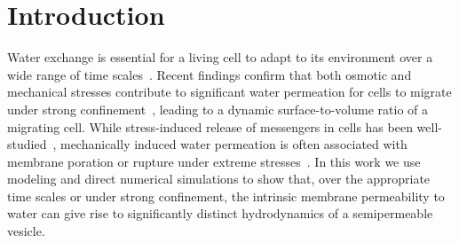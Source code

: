 \documentclass[prb,preprint,showpacs,preprintnumbers,amsmath,amssymb,longbibliography]{revtex4-1}
\begin{document}
\section{Introduction\label{s:introduction}}
Water exchange is essential for a living cell to adapt to its
environment over a wide range of time
scales~\cite{CadartVenkovaRechoEtAl2019_NaturePhys,
AlbertsMolecularBiology, YangMaVerkman2001_JBC,
SugieIntaglietta2018_AmJPhysiolHCP,
SaadounPapadopoulosWatanabeEtAl2005_JCS, Verkman2008_JMM,
BerthaudEtAl2016_SM, Keren2011_EurBJ, TaloniKardashSalmanEtAl2015_PRL}.  
%
Recent findings confirm that both osmotic and mechanical stresses
contribute to significant water permeation for cells to migrate under
strong confinement~\cite{JiangSun2013_BJ, StrokaJiangChenEtAl2014_Cell,
LiMoriSun2015_PRL, yao-mor2017}, leading to a dynamic surface-to-volume
ratio of a migrating cell. While stress-induced release of messengers in
cells has been well-studied~\cite{Wan2008_PNAS, ForsythWan2011_PNAS, 
Russell-PuleriPazAdams2016_AJHCP, ZhangShenHoganBarakatMisbah2018_BJ,
GordonShimmelFrye2020_FP},
mechanically induced water permeation is often associated with membrane
poration or rupture under extreme
stresses~\cite{HarmanBertrandJoos2017_CJP,
RazizadehNikfarPaulLiu2020_BJ}. In this work we use modeling and direct
numerical simulations to show that, over the appropriate time scales or
under strong confinement, the intrinsic membrane permeability to water
can give rise to significantly distinct hydrodynamics of a semipermeable
vesicle. 
\end{document}
